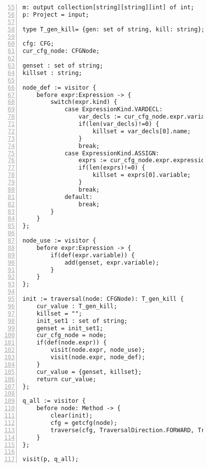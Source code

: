 \begin{figure}[ht!]
\begin{lstlisting}[numbers=left, tabsize=4, escapechar=@, caption={Used defined variable},label={lst:udv-code},firstline=55, firstnumber=55] 
m: output collection[string][string][int] of int;
p: Project = input;

type T_gen_kill= {gen: set of string, kill: string};

cfg: CFG;
cur_cfg_node: CFGNode;

genset : set of string;
killset : string;

node_def := visitor {
	before expr:Expression -> {
		switch(expr.kind) {
			case ExpressionKind.VARDECL: 
				var_decls := cur_cfg_node.expr.variable_decls;
				if(len(var_decls)!=0) {
					killset = var_decls[0].name;
				}				
				break;
			case ExpressionKind.ASSIGN: 
				exprs := cur_cfg_node.expr.expressions;
				if(len(exprs)!=0) {				
					killset = exprs[0].variable;
				}
				break;
			default:
				break;
		}
	}
};

node_use := visitor {
	before expr:Expression -> {
		if(def(expr.variable)) {
			add(genset, expr.variable);			
		}
	}
};

init := traversal(node: CFGNode): T_gen_kill {
	cur_value : T_gen_kill;
	killset = "";
	init_set1 : set of string;
	genset = init_set1;
	cur_cfg_node = node;
	if(def(node.expr)) {
		visit(node.expr, node_use);
		visit(node.expr, node_def);
	}
	cur_value = {genset, killset};
	return cur_value;
};

q_all := visitor {
	before node: Method -> {			
		clear(init);
		cfg = getcfg(node);
		traverse(cfg, TraversalDirection.FORWARD, TraversalKind.HYBRID, init);
	}
};

visit(p, q_all);
\end{lstlisting}
\end{figure}